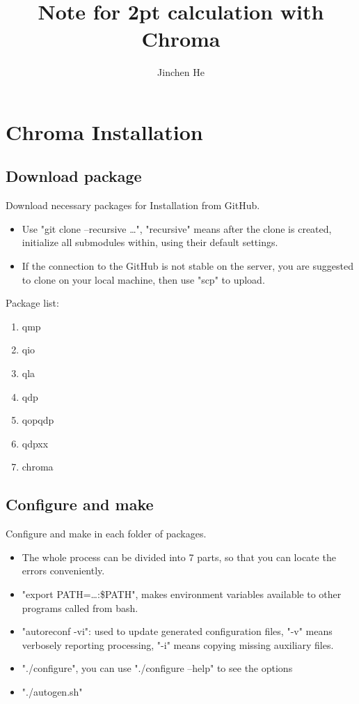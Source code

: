 \documentclass{article}
\title{Note for 2pt calculation with Chroma}
\author{Jinchen He}
\date{}
\begin{document}
\maketitle
\section{Chroma Installation}

\subsection{Download package}

Download necessary packages for Installation from GitHub.

\begin{itemize}
    \item Use "git clone --recursive \dots", "recursive" means after the clone is created, initialize all submodules within, using their default settings.
    \item If the connection to the GitHub is not stable on the server, you are suggested to clone on your local machine, then use "scp" to upload.
\end{itemize}

Package list:

\begin{enumerate}
    \item qmp
    \item qio
    \item qla
    \item qdp
    \item qopqdp
    \item qdpxx
    \item chroma
\end{enumerate}

\subsection{Configure and make}

Configure and make in each folder of packages.

\begin{itemize}
    \item The whole process can be divided into 7 parts, so that you can locate the errors conveniently.
    \item "export PATH=\dots:\$PATH", makes environment variables available to other programs called from bash. 
    \item "autoreconf -vi": used to update generated configuration files, "-v" means verbosely reporting processing, "-i" means copying missing auxiliary files.
    \item "./configure", you can use "./configure –help" to see the options
    \item "./autogen.sh"
\end{itemize}
\end{document}

